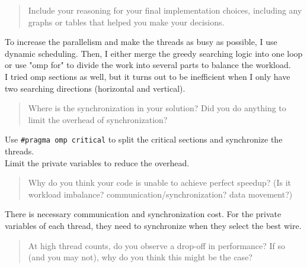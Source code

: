 \documentclass[letterpaper,11pt]{exam}
\begin{document}
\begin{questions}
\begin{enumerate}[label=\roman*.]
              \begin{quote}
                  \hspace{-1.5cm} Include your reasoning for your final implementation choices, including any graphs or tables
                  that helped you make your decisions.
              \end{quote}
              To increase the parallelism and make the threads as busy as possible, I use dynamic scheduling.
              Then, I either merge the greedy searching logic into one loop or use "omp for" to divide the work into several parts to balance the workload. \\
              I tried omp sections as well, but it turns out to be inefficient when I only have two searching directions (horizontal and vertical).\\

              \begin{quote}
                  \hspace{-1.5cm} Where is the synchronization in your solution? Did you do anything to limit the overhead of
                  synchronization?
              \end{quote}

              Use \texttt{\#pragma omp critical} to split the critical sections and synchronize the threads. \\
              Limit the private variables to reduce the overhead. \\

              \begin{quote}
                  \hspace{-1.5cm} Why do you think your code is unable to achieve perfect speedup? (Is it workload imbalance?
                  communication/synchronization? data movement?)
              \end{quote}
              There is necessary communication and synchronization cost.
              For the private variables of each thread, they need to synchronize when they select the best wire. \\

              \begin{quote}
                  \hspace{-1.5cm} At high thread counts, do you observe a drop-off in performance? If so (and you may not), why
                  do you think this might be the case?
              \end{quote}


\end{enumerate}
\end{questions}
\end{document}
